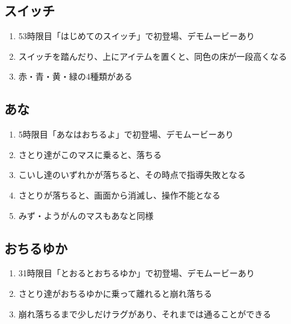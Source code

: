 \subsection{スイッチ}
\begin{enumerate}[label={\sarrow}]
\item 53時限目「はじめてのスイッチ」で初登場、デモムービーあり
\item スイッチを踏んだり、上にアイテムを置くと、同色の床が一段高くなる
\item 赤・青・黄・緑の4種類がある
\end{enumerate}


\subsection{あな}
\begin{enumerate}[label={\sarrow}]
\item 5時限目「あなはおちるよ」で初登場、デモムービーあり
\item さとり達がこのマスに乗ると、落ちる
\item こいし達のいずれかが落ちると、その時点で指導失敗となる
\item さとりが落ちると、画面から消滅し、操作不能となる
\item みず・ようがんのマスもあなと同様
\end{enumerate}


\subsection{おちるゆか}
\begin{enumerate}[label={\sarrow}]
\item 31時限目「とおるとおちるゆか」で初登場、デモムービーあり
\item さとり達がおちるゆかに乗って離れると崩れ落ちる
\item 崩れ落ちるまで少しだけラグがあり、それまでは通ることができる
\end{enumerate}


